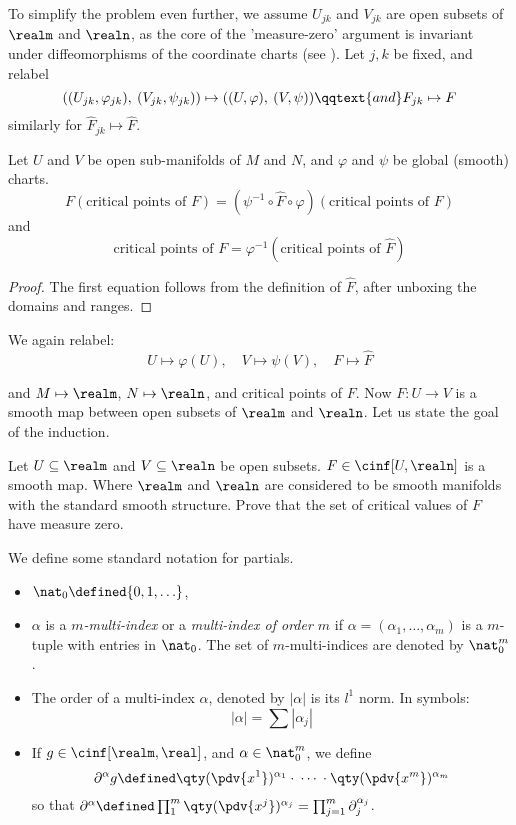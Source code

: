 \documentclass[../main-v2-manifolds.tex]{subfiles}
\begin{document}
To simplify the problem even further, we assume $U_{jk}$ and $V_{jk}$ are open subsets of $\realm$ and $\realn$, as the core of the 'measure-zero' argument is invariant under diffeomorphisms of the coordinate charts (see ). Let $j,k$ be fixed, and relabel
\[
    ((U_{jk},\varphi_{jk}),\: (V_{jk},\psi_{jk}))\mapsto ((U,\varphi),\: (V,\psi))\qqtext{and} F_{jk}\mapsto F
\]
similarly for $\hat{F}_{jk}\mapsto \hat{F}$.

\begin{step}
    Let $U$ and $V$ be open sub-manifolds of $M$ and $N$, and $\varphi$ and $\psi$ be global (smooth) charts.
    \[
        F(\text{critical points of } F) = (\psi^{-1}\circ \hat{F}\circ \varphi)(\text{critical points of }F)
    \]
    and
    \[
        \text{critical points of }F = \varphi^{-1}(\text{critical points of } \hat{F})
    \]
\end{step}
\begin{proof}
    The first equation follows from the definition of $\hat{F}$, after unboxing the domains and ranges.
\end{proof}
We again relabel:
\[
    U\mapsto \varphi(U),\quad V\mapsto \psi(V),\quad F\mapsto \hat{F}
\]

and $M\mapsto \realm$, $N\mapsto \realn$, and critical points of $F$. Now $F: U\to V$ is a smooth map between open subsets of $\realm$ and $\realn$. Let us state the goal of the induction.
\begin{step}\label{lee-sards-simplified-induction-hypothesis}
    Let $U\subseteq\realm$ and $V\subseteq\realn$ be open subsets. $F\in\cinf[U,\realn]$ is a smooth map. Where $\realm$ and $\realn$ are considered to be smooth manifolds with the standard smooth structure. Prove that the set of critical values of $F$ have measure zero.
\end{step}

We define some standard notation for partials.
\begin{itemize}
    \item $\nat_0\defined\{0,1,\ldots\}$,
    \item $\alpha$ is a \emph{$m$-multi-index} or a \emph{multi-index of order $m$} if $\alpha = (\alpha_1,\ldots,\alpha_m)$ is a $m$-tuple with entries in $\nat_0$. The set of $m$-multi-indices are denoted by $\nat_0^m$.
    \item The order of a multi-index $\alpha$, denoted by $|\alpha|$ is its $l^1$ norm. In symbols:
    \[
        |\alpha|=\sum |\alpha_j|
    \]
    \item If $g\in\cinf[\realm,\real]$, and $\alpha\in\nat_0^m$, we define 
    \[
        \partial^\alpha g\defined \qty(\pdv{x^1})^{\alpha_1}\cdot\:\cdots\:\cdot\qty(\pdv{x^m})^{\alpha_m}
    \]
    so that $\partial^\alpha \defined \prod_{1}^m\qty(\pdv{x^j})^{\alpha_j} = \prod_{j=1}^m\partial_j^{\alpha_j}$.
\end{itemize}
\end{document}
